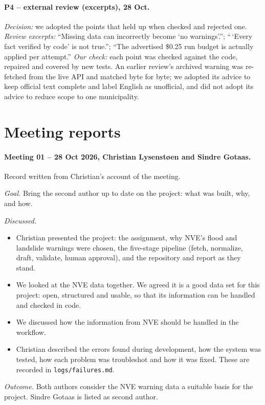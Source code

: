 \documentclass{article}
\begin{document}
\paragraph{P4 -- external review (excerpts), 28 Oct.} \emph{Decision:} we adopted the points that held up when checked and rejected one. \emph{Review excerpts:} ``Missing data can incorrectly become `no warnings'.''; ``\,`Every fact verified by code' is not true.''; ``The advertised \$0.25 run budget is actually applied per attempt.'' \emph{Our check:} each point was checked against the code, repaired and covered by new tests. An earlier review's archived warning was re-fetched from the live API and matched byte for byte; we adopted its advice to keep official text complete and label English as unofficial, and did not adopt its advice to reduce scope to one municipality.

\section{Meeting reports}
\paragraph{Meeting 01 -- 28 Oct 2026, Christian Lysenstøen and Sindre Gotaas.} Record written from Christian's account of the meeting.

\emph{Goal.} Bring the second author up to date on the project: what was built, why, and how.

\emph{Discussed.}
\begin{itemize}
  \item Christian presented the project: the assignment, why NVE's flood and landslide warnings were chosen, the five-stage pipeline (fetch, normalize, draft, validate, human approval), and the repository and report as they stand.
  \item We looked at the NVE data together. We agreed it is a good data set for this project: open, structured and usable, so that its information can be handled and checked in code.
  \item We discussed how the information from NVE should be handled in the workflow.
  \item Christian described the errors found during development, how the system was tested, how each problem was troubleshot and how it was fixed. These are recorded in \texttt{logs/failures.md}.
\end{itemize}

\emph{Outcome.} Both authors consider the NVE warning data a suitable basis for the project. Sindre Gotaas is listed as second author.
\end{document}
